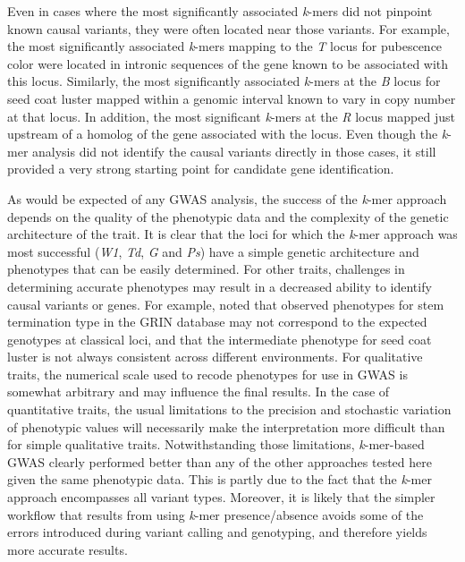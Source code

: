 Even in cases where the most significantly associated \emph{k}-mers did not
pinpoint known causal variants, they were often located near those variants.
For example, the most significantly associated \emph{k}-mers mapping to the
\emph{T} locus for pubescence color were located in intronic sequences of the
gene known to be associated with this locus.  Similarly, the most significantly
associated \emph{k}-mers at the \emph{B} locus for seed coat luster mapped
within a genomic interval known to vary in copy number at that locus. In
addition, the most significant \emph{k}-mers at the \emph{R} locus mapped just
upstream of a homolog of the gene associated with the locus. Even though the
\emph{k}-mer analysis did not identify the causal variants directly in those
cases, it still provided a very strong starting point for candidate gene
identification.

As would be expected of any GWAS analysis, the success of the \emph{k}-mer approach
depends on the quality of the phenotypic data and the complexity of the genetic
architecture of the trait. It is clear that the loci for which the
\emph{k}-mer approach was most successful (\emph{W1}, \emph{Td}, \emph{G} and
\emph{Ps}) have a simple genetic architecture and phenotypes that can be easily
determined. For other traits, challenges in determining accurate phenotypes may
result in a decreased ability to identify causal variants or genes. For
example, \cite{bandillo2017} noted that observed phenotypes for stem
termination type in the GRIN database may not correspond to the expected
genotypes at classical loci, and that the intermediate phenotype for seed coat
luster is not always consistent across different environments. For qualitative
traits, the numerical scale used to recode phenotypes for use in GWAS is somewhat
arbitrary and may influence the final results. In the case of quantitative
traits, the usual limitations to the precision and stochastic variation of
phenotypic values will necessarily make the interpretation more difficult than
for simple qualitative traits. Notwithstanding those limitations,
\textit{k}-mer-based GWAS clearly performed better than any of the other
approaches tested here given the same phenotypic data. This is partly due
to the fact that the \textit{k}-mer approach encompasses all variant types.
Moreover, it is likely that the simpler workflow that results from using
\textit{k}-mer presence/absence avoids some of the errors introduced during
variant calling and genotyping, and therefore yields more accurate results.

